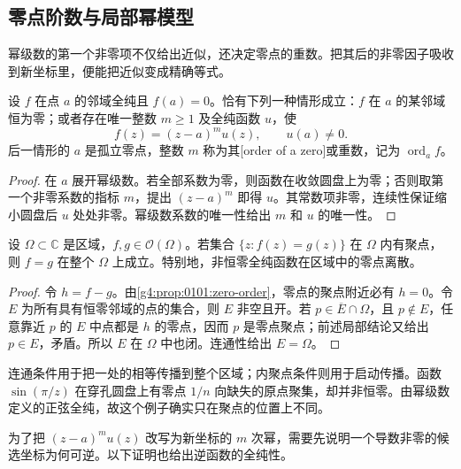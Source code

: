 \subsection{零点阶数与局部幂模型}
\label{g4:subsec:0101:03}
幂级数的第一个非零项不仅给出近似，还决定零点的重数。把其后的非零因子吸收到新坐标里，便能把近似变成精确等式。

\begin{proposition}
	\label{g4:prop:0101:zero-order}
	设 \(f\) 在点 \(a\) 的邻域全纯且 \(f(a)=0\)。恰有下列一种情形成立：\(f\) 在 \(a\) 的某邻域恒为零；或者存在唯一整数 \(m\ge1\) 及全纯函数 \(u\)，使
	\[
		f(z)=(z-a)^m u(z),\qquad u(a)\ne0.
	\]
	后一情形的 \(a\) 是孤立零点，整数 \(m\) 称为其[order of a zero]或重数，记为 \(\operatorname{ord}_a f\)。
\end{proposition}
\begin{proof}
	在 \(a\) 展开幂级数。若全部系数为零，则函数在收敛圆盘上为零；否则取第一个非零系数的指标 \(m\)，提出 \((z-a)^m\) 即得 \(u\)。其常数项非零，连续性保证缩小圆盘后 \(u\) 处处非零。幂级数系数的唯一性给出 \(m\) 和 \(u\) 的唯一性。
\end{proof}

\begin{theorem}[恒等定理]
	\label{g4:thm:0101:identity}
	设 \(\Omega\subset\mathbb C\) 是区域，\(f,g\in\mathcal O(\Omega)\)。若集合 \(\{z:f(z)=g(z)\}\) 在 \(\Omega\) 内有聚点，则 \(f=g\) 在整个 \(\Omega\) 上成立。特别地，非恒零全纯函数在区域中的零点离散。
\end{theorem}
\begin{proof}
	令 \(h=f-g\)。由\cref{g4:prop:0101:zero-order}，零点的聚点附近必有 \(h=0\)。令 \(E\) 为所有具有恒零邻域的点的集合，则 \(E\) 非空且开。若 \(p\in\overline E\cap\Omega\)，且 \(p\notin E\)，任意靠近 \(p\) 的 \(E\) 中点都是 \(h\) 的零点，因而 \(p\) 是零点聚点；前述局部结论又给出 \(p\in E\)，矛盾。所以 \(E\) 在 \(\Omega\) 中也闭。连通性给出 \(E=\Omega\)。
\end{proof}

连通条件用于把一处的相等传播到整个区域；内聚点条件则用于启动传播。函数 \(\sin(\pi/z)\) 在穿孔圆盘上有零点 \(1/n\) 向缺失的原点聚集，却并非恒零。由幂级数定义的正弦全纯，故这个例子确实只在聚点的位置上不同。

\ProseParagraphBreak

为了把 \((z-a)^m u(z)\) 改写为新坐标的 \(m\) 次幂，需要先说明一个导数非零的候选坐标为何可逆。以下证明也给出逆函数的全纯性。

